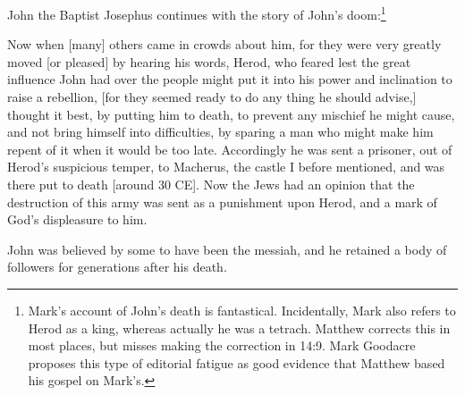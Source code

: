 \documentclass[10pt,a5paper,twoside]{article}
\newcommand{\quotesize}{\normalsize{}}
\newcommand{\comm}[1]{\begingroup \color{black!50} #1\endgroup}
\newenvironment{quotetext}{\begingroup\quotesize}{\endgroup}
\begin{document}
\begin{section}{John the Baptist}
\comm{
Josephus continues with the story of John's doom:\footnote{Mark's account of John's death is fantastical.
Incidentally, Mark also refers to Herod as a king, whereas actually he was a tetrach. Matthew corrects
this in most places, but misses making the correction in 14:9. Mark Goodacre proposes this type of
editorial fatigue as good evidence that Matthew based his gospel on Mark's.}
}\label{john-the-baptist-death}

\begin{quotetext}
Now when [many] others came in crowds about him, for
they were very greatly moved [or pleased] by hearing his words, Herod,
who feared lest the great influence John had over the people might put
it into his power and inclination to raise a rebellion, [for they
seemed ready to do any thing he should advise,] thought it best, by
putting him to death, to prevent any mischief he might cause, and not
bring himself into difficulties, by sparing a man who might make him
repent of it when it would be too late. Accordingly he was sent a
prisoner, out of Herod's suspicious temper, to Macherus, the castle I
before mentioned, and was there put to death [around 30 CE]. Now the Jews had an
opinion that the destruction of this army was sent as a punishment
upon Herod, and a mark of God's displeasure to him.
\end{quotetext}

\comm{
John was believed by some to have been the messiah, and he retained a body of followers for
generations after his death.
}


\end{section}
\end{document}
